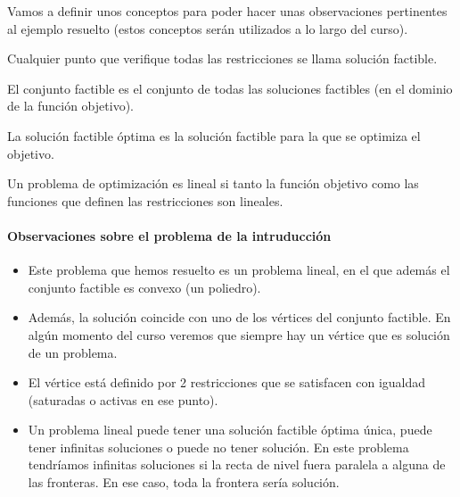 
Vamos a definir unos conceptos para poder hacer unas observaciones pertinentes al ejemplo resuelto (estos conceptos serán utilizados a lo largo del curso).


\begin{defn}
Cualquier punto que verifique todas las restricciones se llama solución factible.
\end{defn}

\begin{defn}
El conjunto factible es el conjunto de todas las soluciones factibles (en el dominio de la función objetivo).
\end{defn}

\begin{defn}
La solución factible óptima es la solución factible para la que se optimiza el objetivo.
\end{defn}

\begin{defn}
Un problema de optimización es lineal si tanto la función objetivo como las funciones que definen las restricciones son lineales.
\end{defn}


\paragraph{Observaciones sobre el problema de la intruducción}
\begin{itemize}
	\item Este problema que hemos resuelto es un problema lineal, en el que además el conjunto factible es convexo (un poliedro).
	\item Además, la solución coincide con uno de los vértices del conjunto factible.
	\subitem En algún momento del curso veremos que siempre hay un vértice que es solución de un problema.
	\item El vértice está definido por 2 restricciones que se satisfacen con igualdad (saturadas o activas en ese punto).
	\item Un problema lineal puede tener una solución factible óptima única, puede tener infinitas soluciones o puede no tener solución.
	\subitem En este problema tendríamos infinitas soluciones si la recta de nivel fuera paralela a alguna de las fronteras. En ese caso, toda la frontera sería solución.
	\subitem 
\end{itemize}

